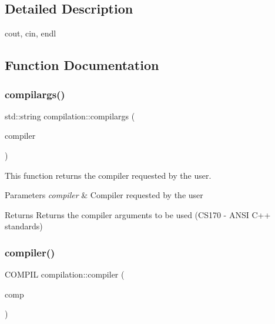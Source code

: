 \subsection{Detailed Description}
cout, cin, endl 

\subsection{Function Documentation}
\mbox{\label{namespacecompilation_a02be2d606b5d56c721ad17b111d53298}} 
\subsubsection{\texorpdfstring{compilargs()}{compilargs()}}
{\footnotesize\ttfamily std\+::string compilation\+::compilargs (\begin{DoxyParamCaption}\item[{C\+O\+M\+P\+IL}]{compiler }\end{DoxyParamCaption})}



This function returns the compiler requested by the user. 


\begin{DoxyParams}{Parameters}
{\em compiler} & Compiler requested by the user\\
\hline
\end{DoxyParams}
\begin{DoxyReturn}{Returns}
Returns the compiler arguments to be used (C\+S170 -\/ A\+N\+SI C++ standards) 
\end{DoxyReturn}
\mbox{\label{namespacecompilation_ade0240a5a26a4d43e6bc19ff6c1b1085}} 
\subsubsection{\texorpdfstring{compiler()}{compiler()}}
{\footnotesize\ttfamily C\+O\+M\+P\+IL compilation\+::compiler (\begin{DoxyParamCaption}\item[{std\+::string}]{comp }\end{DoxyParamCaption})}



